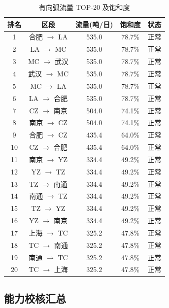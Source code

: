 \documentclass[12pt,a4paper,fontset=none]{ctexart}
\begin{document}
\begin{table}[H]
\centering
\caption{有向弧流量 TOP-20 及饱和度}
\label{tab:top20}
\begin{tabular}{ccccc}
\toprule
\textbf{排名} & \textbf{区段} & \textbf{流量(吨/日)} & \textbf{饱和度} & \textbf{状态} \\
\midrule
 1 & 合肥 $\to$ LA      & 535.0 & 78.7\% & 正常 \\
 2 & LA $\to$ MC        & 535.0 & 78.7\% & 正常 \\
 3 & MC $\to$ 武汉      & 535.0 & 78.7\% & 正常 \\
 4 & 武汉 $\to$ MC      & 535.0 & 78.7\% & 正常 \\
 5 & MC $\to$ LA        & 535.0 & 78.7\% & 正常 \\
 6 & LA $\to$ 合肥      & 535.0 & 78.7\% & 正常 \\
 7 & CZ $\to$ 南京      & 504.0 & 74.1\% & 正常 \\
 8 & 南京 $\to$ CZ      & 504.0 & 74.1\% & 正常 \\
 9 & 合肥 $\to$ CZ      & 435.4 & 64.0\% & 正常 \\
10 & CZ $\to$ 合肥      & 435.4 & 64.0\% & 正常 \\
11 & 南京 $\to$ YZ      & 334.4 & 49.2\% & 正常 \\
12 & YZ $\to$ TZ        & 334.4 & 49.2\% & 正常 \\
13 & TZ $\to$ 南通      & 334.4 & 49.2\% & 正常 \\
14 & 南通 $\to$ TZ      & 334.4 & 49.2\% & 正常 \\
15 & TZ $\to$ YZ        & 334.4 & 49.2\% & 正常 \\
16 & YZ $\to$ 南京      & 334.4 & 49.2\% & 正常 \\
17 & 上海 $\to$ TC      & 325.2 & 47.8\% & 正常 \\
18 & TC $\to$ 南通      & 325.2 & 47.8\% & 正常 \\
19 & 南通 $\to$ TC      & 325.2 & 47.8\% & 正常 \\
20 & TC $\to$ 上海      & 325.2 & 47.8\% & 正常 \\
\bottomrule
\end{tabular}
\end{table}

\subsection{能力校核汇总}
\end{document}
